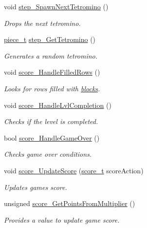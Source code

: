 \begin{DoxyCompactItemize}
void \mbox{\hyperlink{classTetreesEngine_a446196c2260e2ce2ac0d18848ee6b636}{step\+\_\+\+Spawn\+Next\+Tetromino}} ()
\begin{DoxyCompactList}\small\item\em Drops the next tetromino. \end{DoxyCompactList}\item 
\mbox{\hyperlink{structpiece__t}{piece\+\_\+t}} \mbox{\hyperlink{classTetreesEngine_a94d5fd25eec05994f02bb514496ec66d}{step\+\_\+\+Get\+Tetromino}} ()
\begin{DoxyCompactList}\small\item\em Generates a random tetromino. \end{DoxyCompactList}\item 
void \mbox{\hyperlink{classTetreesEngine_ad379bf5d98a182411d4d91b12b6ef5ba}{score\+\_\+\+Handle\+Filled\+Rows}} ()
\begin{DoxyCompactList}\small\item\em Looks for rows filled with \mbox{\hyperlink{TetreesDefs_8hpp_ad8f0654cf997b7ea7eb14924d0b1ea33}{blocks}}. \end{DoxyCompactList}\item 
void \mbox{\hyperlink{classTetreesEngine_aa7d501cb6f73111321e1dadbc140ebc8}{score\+\_\+\+Handle\+Lvl\+Completion}} ()
\begin{DoxyCompactList}\small\item\em Checks if the level is completed. \end{DoxyCompactList}\item 
bool \mbox{\hyperlink{classTetreesEngine_a31898b1228f8b0381a82871669503b34}{score\+\_\+\+Handle\+Game\+Over}} ()
\begin{DoxyCompactList}\small\item\em Checks game over conditions. \end{DoxyCompactList}\item 
void \mbox{\hyperlink{classTetreesEngine_a856a9de6a79138a19b638d9287d7bc72}{score\+\_\+\+Update\+Score}} (\mbox{\hyperlink{TetreesDefs_8hpp_a5a3b4d94c69ae85b911a8dca1afedfe0}{score\+\_\+t}} score\+Action)
\begin{DoxyCompactList}\small\item\em Updates game\textquotesingle{}s score. \end{DoxyCompactList}\item 
unsigned \mbox{\hyperlink{classTetreesEngine_a848fc0ff4003f3c4d74c11efdc91f0cb}{score\+\_\+\+Get\+Points\+From\+Multiplier}} ()
\begin{DoxyCompactList}\small\item\em Provides a value to update game score. \end{DoxyCompactList}\end{DoxyCompactItemize}

